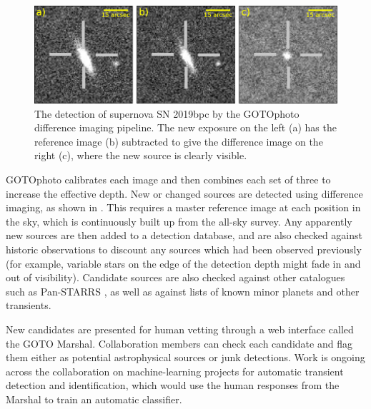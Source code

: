 \begin{colsection}
\newpage

\begin{figure}[t]
    \begin{center}
        \includegraphics[width=\linewidth]{images/diffimg.pdf}
    \end{center}
    \caption[The detection of SN 2019bpc through difference imaging]{
        The detection of supernova SN 2019bpc by the GOTOphoto difference imaging pipeline. The new exposure on the left (a) has the reference image (b) subtracted to give the difference image on the right (c), where the new source is clearly visible.
    }\label{fig:diffimg}
\end{figure}

GOTOphoto calibrates each image and then combines each set of three to increase the effective depth. New or changed sources are detected using difference imaging, as shown in . This requires a master reference image at each position in the sky, which is continuously built up from the all-sky survey. Any apparently new sources are then added to a detection database, and are also checked against historic observations to discount any sources which had been observed previously (for example, variable stars on the edge of the detection depth might fade in and out of visibility). Candidate sources are also checked against other catalogues such as Pan-STARRS \citep{Pan-STARRS}, as well as against lists of known minor planets and other transients.

New candidates are presented for human vetting through a web interface called the GOTO Marshal. Collaboration members can check each candidate and flag them either as potential astrophysical sources or junk detections. Work is ongoing across the collaboration on machine-learning projects for automatic transient detection and identification, which would use the human responses from the Marshal to train an automatic classifier.

\newpage

\end{colsection}

